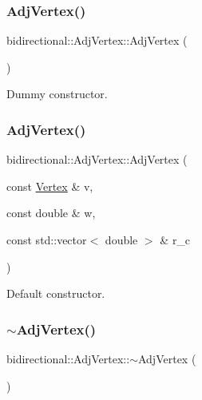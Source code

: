 \subsubsection{\texorpdfstring{Adj\+Vertex()}{AdjVertex()}\hspace{0.1cm}{\footnotesize\ttfamily [1/2]}}
{\footnotesize\ttfamily bidirectional\+::\+Adj\+Vertex\+::\+Adj\+Vertex (\begin{DoxyParamCaption}{ }\end{DoxyParamCaption})\hspace{0.3cm}{\ttfamily [inline]}}



Dummy constructor. 

\mbox{\label{structbidirectional_1_1AdjVertex_a7ae2095e5e51da0ce10408f37e2e602c}} 
\subsubsection{\texorpdfstring{Adj\+Vertex()}{AdjVertex()}\hspace{0.1cm}{\footnotesize\ttfamily [2/2]}}
{\footnotesize\ttfamily bidirectional\+::\+Adj\+Vertex\+::\+Adj\+Vertex (\begin{DoxyParamCaption}\item[{const \hyperlink{structbidirectional_1_1Vertex}{Vertex} \&}]{v,  }\item[{const double \&}]{w,  }\item[{const std\+::vector$<$ double $>$ \&}]{r\+\_\+c }\end{DoxyParamCaption})\hspace{0.3cm}{\ttfamily [inline]}}



Default constructor. 

\mbox{\label{structbidirectional_1_1AdjVertex_a86d0c4e2bcd2c7915d9aa2fc5a38bd0c}} 
\subsubsection{\texorpdfstring{$\sim$\+Adj\+Vertex()}{~AdjVertex()}}
{\footnotesize\ttfamily bidirectional\+::\+Adj\+Vertex\+::$\sim$\+Adj\+Vertex (\begin{DoxyParamCaption}{ }\end{DoxyParamCaption})\hspace{0.3cm}{\ttfamily [inline]}}



